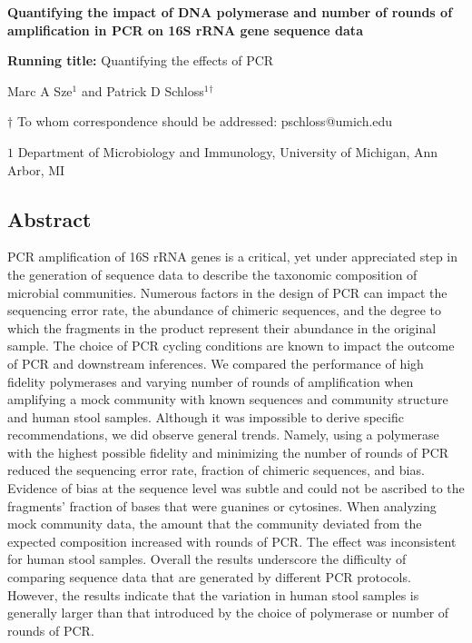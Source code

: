 \documentclass[11pt,]{article}
\title{}
\author{}
\date{}
\begin{document}
\vspace{25mm}
\begin{center}


\textbf{\huge Quantifying the impact of DNA polymerase and number of rounds of amplification in PCR on 16S rRNA gene sequence data}

\vspace{50mm}



\textbf{Running title:} Quantifying the effects of PCR

\vspace{25mm}

Marc A Sze${^1}$ and Patrick D Schloss${^1}$${^\dagger}$

\vspace{20mm}

$\dagger$ To whom correspondence should be addressed: pschloss@umich.edu

$1$ Department of Microbiology and Immunology, University of Michigan, Ann Arbor, MI

\end{center}

\newpage
\linenumbers

\hypertarget{abstract}{%
\subsection{Abstract}\label{abstract}}

PCR amplification of 16S rRNA genes is a critical, yet under appreciated
step in the generation of sequence data to describe the taxonomic
composition of microbial communities. Numerous factors in the design of
PCR can impact the sequencing error rate, the abundance of chimeric
sequences, and the degree to which the fragments in the product
represent their abundance in the original sample. The choice of PCR
cycling conditions are known to impact the outcome of PCR and downstream
inferences. We compared the performance of high fidelity polymerases and
varying number of rounds of amplification when amplifying a mock
community with known sequences and community structure and human stool
samples. Although it was impossible to derive specific recommendations,
we did observe general trends. Namely, using a polymerase with the
highest possible fidelity and minimizing the number of rounds of PCR
reduced the sequencing error rate, fraction of chimeric sequences, and
bias. Evidence of bias at the sequence level was subtle and could not be
ascribed to the fragments' fraction of bases that were guanines or
cytosines. When analyzing mock community data, the amount that the
community deviated from the expected composition increased with rounds
of PCR. The effect was inconsistent for human stool samples. Overall the
results underscore the difficulty of comparing sequence data that are
generated by different PCR protocols. However, the results indicate that
the variation in human stool samples is generally larger than that
introduced by the choice of polymerase or number of rounds of PCR.
\end{document}
